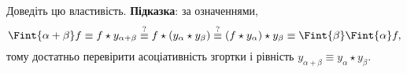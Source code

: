 \begin{exercise}
    Доведіть цю властивість. \textbf{Підказка}: за означеннями,
    \begin{equation}
        \Fint{\alpha + \beta} f \equiv f \star y_{\alpha + \beta} \overset{?}{\equiv} f \star (y_\alpha \star y_\beta) \overset{?}{\equiv} (f \star y_\alpha) \star y_\beta \equiv \Fint{\beta} \Fint{\alpha} f,
    \end{equation}
    тому достатньо перевірити асоціативність згортки і рівність $y_{\alpha + \beta} \equiv y_\alpha \star y_\beta$.
\end{exercise}
        
